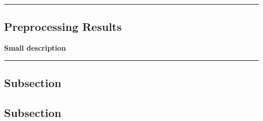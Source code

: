 {\color{gray}\hrule}
\begin{center}
\section{Preprocessing Results}
\textbf{Small description}
\end{center}
{\color{gray}\hrule}
\begin{multicols}{2}
\subsection{Subsection}
\lipsum[1-3]
\subsection{Subsection}
\lipsum[1-2]
\end{multicols}